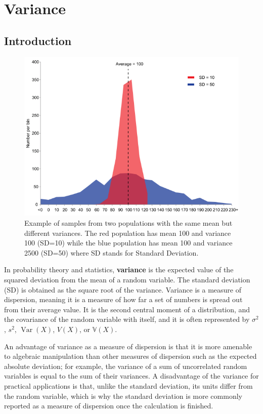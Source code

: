 \chapter{Variance}

\section{Introduction}

\begin{figure}
\centering
\includegraphics[width=0.9 \textwidth]{Comparison_standard_deviations}
\caption{Example of samples from two populations with the same mean
  but different variances. The red population has mean 100 and
  variance 100 (SD=10) while the blue population has mean 100 and
  variance 2500 (SD=50) where SD stands for Standard Deviation.}
\end{figure}

In probability theory and statistics, \textbf{variance} is the
expected value of the squared deviation from the mean of a random
variable. The standard deviation (SD) is obtained as the square root
of the variance. Variance is a measure of dispersion, meaning it is a
measure of how far a set of numbers is spread out from their average
value. It is the second central moment of a distribution, and the
covariance of the random variable with itself, and it is often
represented by $\sigma^2$, $s^2$, $\operatorname{Var}(X)$, $V(X)$, or
$\mathbb{V}(X)$.

An advantage of variance as a measure of dispersion is that it is more
amenable to algebraic manipulation than other measures of dispersion
such as the expected absolute deviation; for example, the variance of
a sum of uncorrelated random variables is equal to the sum of their
variances. A disadvantage of the variance for practical applications
is that, unlike the standard deviation, its units differ from the
random variable, which is why the standard deviation is more commonly
reported as a measure of dispersion once the calculation is finished.

